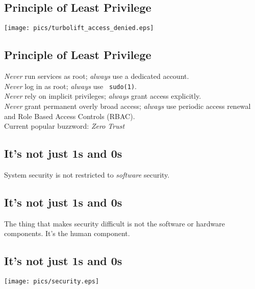 \documentclass[xga]{xdvislides}
\begin{document}
\subsection{Principle of Least Privilege}
\vspace*{\fill}
\begin{center}
	\texttt{[image: pics/turbolift\_access\_denied.eps]}
\end{center}
\vspace*{\fill}

\subsection{Principle of Least Privilege}

{\em Never} run services as root; {\em always} use a
dedicated account. \\

{\em Never} log in as root; {\em always} use {\tt
sudo(1)}. \\

{\em Never} rely on implicit privileges; {\em always}
grant access explicitly. \\

{\em Never} grant permanent overly broad access; {\em
always} use periodic access renewal and Role Based
Access Controls (RBAC).
\\

\vspace{.5in}
Current popular buzzword: {\em Zero Trust}


\subsection{It's not just 1s and 0s}
\vspace{.5in}
\Huge
\begin{center}
System security is not restricted to {\em software} security.
\end{center}
\Normalsize

\subsection{It's not just 1s and 0s}
\vspace{.5in}
\Huge
\begin{center}
The thing that makes security difficult is not the software or hardware
components.  It's the human component.
\end{center}
\Normalsize

\subsection{It's not just 1s and 0s}
\vspace*{\fill}
\begin{center}
	\texttt{[image: pics/security.eps]}
\end{center}
\vspace*{\fill}
\end{document}
